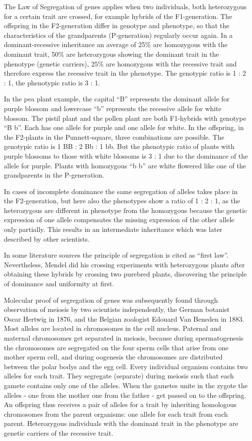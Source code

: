 The Law of Segregation of genes applies when two individuals, both heterozygous for a certain trait are crossed, for example hybrids of the F1-generation. The offspring in the F2-generation differ in genotype and phenotype, so that the characteristics of the grandparents (P-generation) regularly occur again. In a dominant-recessive inheritance an average of 25\% are homozygous with the dominant trait, 50\% are heterozygous showing the dominant trait in the phenotype (genetic carriers), 25\% are homozygous with the recessive trait and therefore express the recessive trait in the phenotype. The genotypic ratio is 1 : 2 : 1, the phenotypic ratio is 3 : 1.

In the pea plant example, the capital ``B'' represents the dominant allele for purple blossom and lowercase ``b'' represents the recessive allele for white blossom. The pistil plant and the pollen plant are both F1-hybrids with genotype ``B b''. Each has one allele for purple and one allele for white. In the offspring, in the F2-plants in the Punnett-square, three combinations are possible. The genotypic ratio is 1 BB : 2 Bb : 1 bb. But the phenotypic ratio of plants with purple blossoms to those with white blossoms is 3 : 1 due to the dominance of the allele for purple. Plants with homozygous ``b b'' are white flowered like one of the grandparents in the P-generation.

In cases of incomplete dominance the same segregation of alleles takes place in the F2-generation, but here also the phenotypes show a ratio of 1 : 2 : 1, as the heterozygous are different in phenotype from the homozygous because the genetic expression of one allele compensates the missing expression of the other allele only partially. This results in an intermediate inheritance which was later described by other scientists.

In some literature sources the principle of segregation is cited as ``first law''. Nevertheless, Mendel did his crossing experiments with heterozygous plants after obtaining these hybrids by crossing two purebred plants, discovering the principle of dominance and uniformity at first.

Molecular proof of segregation of genes was subsequently found through observation of meiosis by two scientists independently, the German botanist Oscar Hertwig in 1876, and the Belgian zoologist Edouard Van Beneden in 1883. Most alleles are located in chromosomes in the cell nucleus. Paternal and maternal chromosomes get separated in meiosis, because during spermatogenesis the chromosomes are segregated on the four sperm cells that arise from one mother sperm cell, and during oogenesis the chromosomes are distributed between the polar bodys and the egg cell. Every individual organism contains two alleles for each trait. They segregate (separate) during meiosis such that each gamete contains only one of the alleles. When the gametes unite in the zygote the alleles - one from the mother one from the father - get passed on to the offspring. An offspring thus receives a pair of alleles for a trait by inheriting homologous chromosomes from the parent organisms: one allele for each trait from each parent. Heterozygous individuals with the dominant trait in the phenotype are genetic carriers of the recessive trait.

